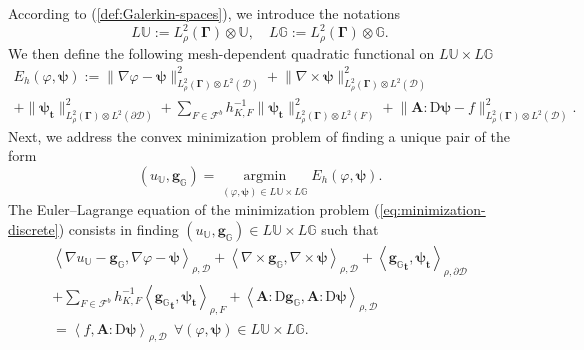 \documentclass[final,onefignum,onetabnum]{mousaviart}
\begin{document}
	\vspace*{1mm}
	According to (\ref{def:Galerkin-spaces}), we introduce the notations
	\begin{equation*}
		L\mathbb{U}:= L^2_{\rho}(\boldsymbol{\Gamma}) \otimes \mathbb{U}, 
		\quad
		L\mathbb{G}:= L^2_{\rho}(\boldsymbol{\Gamma}) \otimes \mathbb{G}.
	\end{equation*}
	We then define the following mesh-dependent quadratic functional on $L\mathbb{U} \times L\mathbb{G}$
	\begin{multline}
		\label{fun:cost-functional-discerete-local}
		E_h(\varphi, \boldsymbol{\psi}):= \lVert \nabla \varphi - \boldsymbol{\psi} \rVert^2_{L^2_{\rho}(\boldsymbol{\Gamma}) \otimes L^2(\mathcal{D})}
		+
		\lVert \nabla \times \boldsymbol{\psi} \rVert^2_{ L^2_{\rho}(\boldsymbol{\Gamma}) \otimes L^2(\mathcal{D})} 
		\\
		+
		\lVert \boldsymbol{\psi}_{\boldsymbol{t}} \rVert^2_{ L^2_{\rho}(\boldsymbol{\Gamma}) \otimes L^2(\partial \mathcal{D})}
		+
		\sum_{F \in \mathcal{F}^b}
		h_{K,F}^{-1}\lVert \boldsymbol{\psi}_{\boldsymbol{t}} \rVert^2_{L^2_{\rho}(\boldsymbol{\Gamma}) \otimes L^2(F)}
		+
		\lVert \boldsymbol{A}:\mathrm{D} \boldsymbol{\psi} - f\rVert_{ L^2_{\rho}(\boldsymbol{\Gamma}) \otimes L^2(\mathcal{D})}^2.
	\end{multline}
	Next, we address the convex minimization problem of finding a unique pair of the form
	\begin{equation}
		\label{eq:minimization-discrete}
		(u_{\mathbb{U}}, \boldsymbol{g}_{\mathbb{G}})= 
		\underset
		{\substack{
				(\varphi, \boldsymbol{\psi})\in 
				L \mathbb{U}  \times L \mathbb{G}
		}}
		{\mathrm{argmin}}
		E_h(\varphi ,\boldsymbol{\psi}).
	\end{equation}
	The Euler–Lagrange equation of the minimization problem (\ref{eq:minimization-discrete}) consists in finding $(u_\mathbb{U}, \boldsymbol{g}_\mathbb{G}) \in  L\mathbb{U} \times L\mathbb{G} $ such that
	\begin{multline}
		\label{eq:Euler-Lagrange-stochastic-discrete-local}
		\left\langle \nabla u_{\mathbb{U}} - \boldsymbol{g}_{\mathbb{G}}, \nabla\varphi - \boldsymbol{\psi} \right\rangle_{\rho,\mathcal{D}}  
		+
		\left\langle  \nabla \times \boldsymbol{g}_{\mathbb{G}}, \nabla \times \boldsymbol{\psi} \right\rangle_{\rho, \mathcal{D}} 
		+
		\left\langle  {\boldsymbol{g}_{\mathbb{G}}}_{\boldsymbol{t}} , \boldsymbol{\psi}_{\boldsymbol{t}} \right\rangle _{\rho,\partial \mathcal{D}}
		\\
		+
		\sum_{F \in \mathcal{F}^b} h_{K,F}^{-1}\left\langle {\boldsymbol{g}_{\mathbb{G}}}_{\boldsymbol{t}} , \boldsymbol{\psi}_{\boldsymbol{t}} \right\rangle _{\rho, F}
		+
		\left\langle  \boldsymbol{A}:\mathrm{D} \boldsymbol{g}_{\mathbb{G}}, \boldsymbol{A}:\mathrm{D} \boldsymbol{\psi} \right\rangle_{\rho, \mathcal{D}} 
		\\
		= 
		\left\langle  f, \boldsymbol{A}:\mathrm{D} \boldsymbol{\psi} \right\rangle_{\rho, \mathcal{D}} 
		~~
		\forall (\varphi, \boldsymbol{\psi}) \in 
		L \mathbb{U} \times L \mathbb{G}.
	\end{multline}
\end{document}
